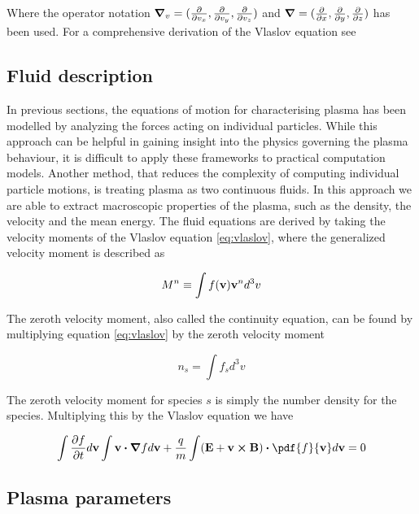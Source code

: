 Where the operator notation $\grad_v = (\pdv{v_x}, \pdv{v_y}, \pdv{v_z})$ and $\grad = (\pdv{x},\pdv{y},\pdv{z})$ has been used. For a comprehensive derivation of the Vlaslov equation see 


\subsection{Fluid description}
In previous sections, the equations of motion for characterising plasma has been modelled by analyzing the forces acting on individual particles. While this approach can be helpful in gaining insight into the physics governing the plasma behaviour, it is difficult to apply these frameworks to practical computation models. 
\vskip 1mm
Another method, that reduces the complexity of computing individual particle motions, is treating plasma as two continuous fluids. In this approach we are able to extract macroscopic properties of the plasma, such as the density, the velocity and the mean energy. The fluid equations are derived by taking the velocity moments of the Vlaslov equation \ref{eq:vlaslov}, where the generalized velocity moment is described as

\begin{equation}\label{eq:moment}
    M^n \equiv \int f(\vb{v}) \vb{v}^n d^3v
\end{equation}

The zeroth velocity moment, also called the continuity equation, can be found by multiplying equation \ref{eq:vlaslov} by the zeroth velocity moment 

\begin{equation}\label{eq:zeromoment}
    n_s = \int f_s d^3 v
\end{equation}

The zeroth velocity moment for species $s$ is simply the number density for the species. Multiplying this by the Vlaslov equation we have

\begin{equation}\label{eq:continuity}
    \int \pdv{f}{t} d \vb{v} \int \vb{v} \vdot \grad{f} d\vb{v} + \frac{q}{m} \int (\vb{E} + \vb{v} \cross \vb{B})  \vdot \pdf{f}{\vb{v}} d\vb{v} = 0
\end{equation}

\subsection{Plasma parameters}
\label{subsec:pParam}


